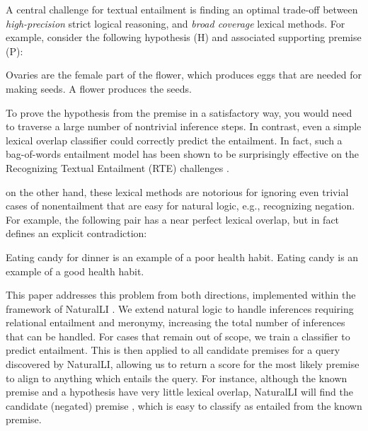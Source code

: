 A central challenge for textual entailment is finding an optimal trade-off between
  \textit{high-precision} strict logical reasoning, and \textit{broad coverage}
  lexical methods.
For example, consider the following hypothesis (H) and associated supporting premise (P):

\entailmentExample
{Ovaries are the female part of the flower, which produces eggs that are needed for making seeds.}
{A flower produces the seeds.}

To prove the hypothesis from the premise in a satisfactory way, you would need
  to traverse a large number of nontrivial inference steps.
In contrast, even a simple lexical overlap classifier could correctly predict
  the entailment.
In fact, such a bag-of-words entailment model has been shown to be surprisingly
  effective on the Recognizing Textual Entailment (RTE) challenges 
  \cite{key:2009maccartney-thesis}.

on the other hand, these lexical methods are notorious for ignoring even trivial 
  cases of nonentailment that are easy for natural logic, e.g., recognizing negation.
For example, the following pair has a near perfect lexical overlap, but in fact defines
  an explicit contradiction:

\entailmentExample
{Eating candy for dinner is an example of a poor health habit.}
{Eating candy is an example of a good health habit.}


This paper addresses this problem from both directions, implemented within the
  framework of NaturalLI \cite{key:2014angeli-naturalli}.
We extend natural logic to handle inferences requiring relational entailment 
  and meronymy, increasing the total number of inferences that can be handled.
For cases that remain out of scope, we train a classifier to predict 
  entailment.
This is then applied to all candidate premises for a query discovered by 
  NaturalLI, allowing us to return a score for the most likely premise to
  align to anything which entails the query.
For instance, although the known premise  
  and a hypothesis  
  have very little lexical overlap, NaturalLI
  will find the candidate (negated) premise ,
  which is easy to classify as entailed from the known premise.
  

